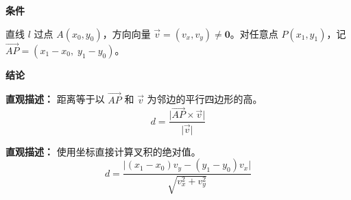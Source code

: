 \begin{statementbox}

	\textbf{\textcolor{CStatement}{条件}}
	\begin{description}[style=nextline, leftmargin=2.8em, labelsep=0.5em, itemsep=0.35em]
		\item[\textbf{\textcolor{CStatement}{条件1（点与方向）：}}] 直线 $l$ 过点 $A(x_0,y_0)$，方向向量 $\vec{v}=(v_x,v_y)\neq\mathbf{0}$。对任意点 $P(x_1,y_1)$，记 $\vec{AP}=(x_1-x_0,\;y_1-y_0)$。
	\end{description}

	\textbf{\textcolor{CStatement}{结论}}
	\begin{description}[style=nextline, leftmargin=2.8em, labelsep=0.5em, itemsep=0.45em]
		\item[\textbf{\textcolor{CStatement}{结论一（向量叉积）：}}]
			\textbf{\textcolor{CStatement}{直观描述：}}
			距离等于以 $\vec{AP}$ 和 $\vec{v}$ 为邻边的平行四边形的高。
			\[
				d = \frac{\lvert\vec{AP}\times\vec{v}\rvert}{\lvert\vec{v}\rvert}
			\]

		\item[\textbf{\textcolor{CStatement}{推广结论（坐标展开）：}}]
			\textbf{\textcolor{CStatement}{直观描述：}}
			使用坐标直接计算叉积的绝对值。
			\[
				d = \frac{\lvert (x_1-x_0)v_y - (y_1-y_0)v_x \rvert}{\sqrt{v_x^2+v_y^2}}
			\]
	\end{description}

\end{statementbox}

